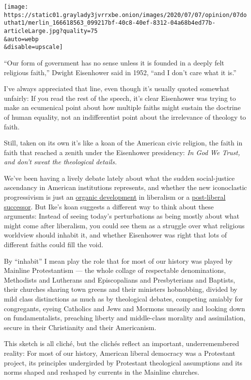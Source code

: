 \texttt{[image: https://static01.graylady3jvrrxbe.onion/images/2020/07/07/opinion/07douthat1/merlin\_166618563\_099217bf-40c8-40ef-8312-04a68b4ed77b-articleLarge.jpg?quality=75\\\&auto=webp\\\&disable=upscale]}

``Our form of government has no sense unless it is founded in a deeply
felt religious faith,'' Dwight Eisenhower said in 1952, ``and I don't
care what it is.''

I've always appreciated that line, even though it's usually quoted
somewhat unfairly: If you read the rest of the speech, it's clear
Eisenhower was trying to make an ecumenical point about how multiple
faiths might sustain the doctrine of human equality, not an
indifferentist point about the irrelevance of theology to faith.

Still, taken on its own it's like a koan of the American civic religion,
the faith in faith that reached a zenith under the Eisenhower
presidency: \emph{In God We Trust, and don't sweat the theological
details.}

We've been having a lively debate lately about what the sudden
social-justice ascendancy in American institutions represents, and
whether the new iconoclastic progressivism is just an
\href{https://newrepublic.com/article/158346/willful-blindness-reactionary-liberalism}{organic
development} in liberalism or a
\href{https://www.nytimes3xbfgragh.onion/2020/06/12/opinion/nyt-tom-cotton-oped-liberalism.html}{post-liberal
successor}. But Ike's koan suggests a different way to think about these
arguments: Instead of seeing today's perturbations as being mostly about
what might come after liberalism, you could see them as a struggle over
what religious worldview should inhabit it, and whether Eisenhower was
right that lots of different faiths could fill the void.

By ``inhabit'' I mean play the role that for most of our history was
played by Mainline Protestantism --- the whole collage of respectable
denominations, Methodists and Lutherans and Episcopalians and
Presbyterians and Baptists, their churches sharing town greens and their
ministers hobnobbing, divided by mild class distinctions as much as by
theological debates, competing amiably for congregants, eyeing Catholics
and Jews and Mormons uneasily and looking down on fundamentalists,
preaching liberty and middle-class morality and assimilation, secure in
their Christianity and their Americanism.

This sketch is all cliché, but the clichés reflect an important,
underremembered reality: For most of our history, American liberal
democracy was a Protestant project, its principles undergirded by
Protestant theological assumptions and its norms shaped and reshaped by
currents in the Mainline churches.

